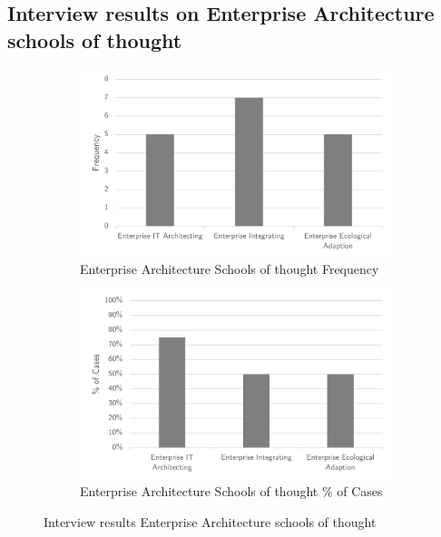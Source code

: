 \subsection{Interview results on Enterprise Architecture schools of thought}
\label{sub:interviewresultseaschools}
\begin{figure}[H]
	\centering
	\begin{subfigure}[H]{0.5\textwidth}
		\centering
		\includegraphics[width=0.95\linewidth]{images/easchools_frequency}
		\caption{Enterprise Architecture Schools of thought Frequency}
		\label{fig:easchoolsfrequency}
	\end{subfigure}%
	\begin{subfigure}[H]{0.5\textwidth}
		\centering
		\includegraphics[width=0.95\linewidth]{images/easchools_cases}
		\caption{Enterprise Architecture Schools of thought \% of Cases}
		\label{fig:easchoolscases}
	\end{subfigure}
	\caption{Interview results Enterprise Architecture schools of thought}
	\label{fig:easchoolsantifragile}
\end{figure}




